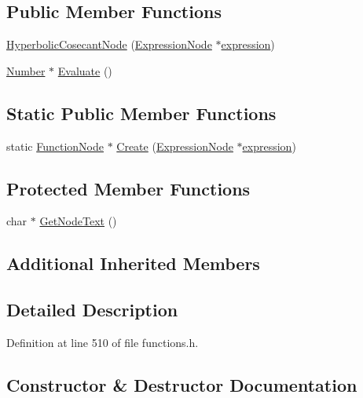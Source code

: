 \subsection*{Public Member Functions}
\begin{DoxyCompactItemize}
\item 
\hyperlink{classHyperbolicCosecantNode_ad0da5d38d47fa26a9e31e2b3926b914d}{Hyperbolic\+Cosecant\+Node} (\hyperlink{classExpressionNode}{Expression\+Node} $\ast$\hyperlink{classFunctionNode_ad7577b179a1937aaf8a0058bb5b546dc}{expression})
\item 
\hyperlink{structNumber}{Number} $\ast$ \hyperlink{classHyperbolicCosecantNode_a974a45cab3da5b79271db954e8d4825a}{Evaluate} ()
\end{DoxyCompactItemize}
\subsection*{Static Public Member Functions}
\begin{DoxyCompactItemize}
\item 
static \hyperlink{classFunctionNode}{Function\+Node} $\ast$ \hyperlink{classHyperbolicCosecantNode_a36dba4574a0322666733d91973a194ba}{Create} (\hyperlink{classExpressionNode}{Expression\+Node} $\ast$\hyperlink{classFunctionNode_ad7577b179a1937aaf8a0058bb5b546dc}{expression})
\end{DoxyCompactItemize}
\subsection*{Protected Member Functions}
\begin{DoxyCompactItemize}
\item 
char $\ast$ \hyperlink{classHyperbolicCosecantNode_a5c7914b05121193ac4adfdbf01166f43}{Get\+Node\+Text} ()
\end{DoxyCompactItemize}
\subsection*{Additional Inherited Members}


\subsection{Detailed Description}


Definition at line 510 of file functions.\+h.



\subsection{Constructor \& Destructor Documentation}
